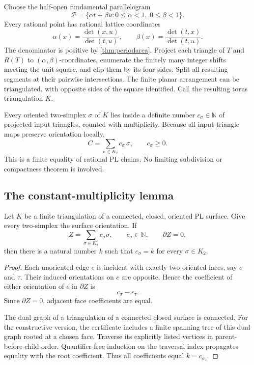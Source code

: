 Choose the half-open fundamental parallelogram
\[
 \mathcal P=\{\alpha t+\beta u:0\leq\alpha<1,\;0\leq\beta<1\}.
\]
Every rational point has rational lattice coordinates
\begin{equation}
 \alpha(x)=\frac{\det(x,u)}{\det(t,u)},
 \qquad
 \beta(x)=\frac{\det(t,x)}{\det(t,u)}.
 \label{eq:latticecoords}
\end{equation}
The denominator is positive by \cref{thm:periodarea}.  Project each triangle of \(T\) and \(R(T)\) to \((\alpha,\beta)\)-coordinates, enumerate the finitely many integer shifts meeting the unit square, and clip them by its four sides.  Split all resulting segments at their pairwise intersections.  The finite planar arrangement can be triangulated, with opposite sides of the square identified.  Call the resulting torus triangulation \(K\).

Every oriented two-simplex \(\sigma\) of \(K\) lies inside a definite number \(c_\sigma\in\mathbb N\) of projected input triangles, counted with multiplicity.  Because all input triangle maps preserve orientation locally,
\begin{equation}
 C=\sum_{\sigma\in K_2} c_\sigma\,\sigma,
 \qquad c_\sigma\geq 0.
 \label{eq:facecoeff}
\end{equation}
This is a finite equality of rational PL chains.  No limiting subdivision or compactness theorem is involved.

\subsection{The constant-multiplicity lemma}

\begin{lemma}
\label{lem:constantmultiplicity}
Let \(K\) be a finite triangulation of a connected, closed, oriented PL surface.  Give every two-simplex the surface orientation.  If
\[
 Z=\sum_{\sigma\in K_2} c_\sigma\sigma,
 \qquad c_\sigma\in\mathbb N,
 \qquad \partial Z=0,
\]
then there is a natural number \(k\) such that \(c_\sigma=k\) for every \(\sigma\in K_2\).
\end{lemma}
\begin{proof}
Each unoriented edge \(e\) is incident with exactly two oriented faces, say \(\sigma\) and \(\tau\).  Their induced orientations on \(e\) are opposite.  Hence the coefficient of either orientation of \(e\) in \(\partial Z\) is
\[
 c_\sigma-c_\tau.
\]
Since \(\partial Z=0\), adjacent face coefficients are equal.

The dual graph of a triangulation of a connected closed surface is connected.  For the constructive version, the certificate includes a finite spanning tree of this dual graph rooted at a chosen face.  Traverse its explicitly listed vertices in parent-before-child order.  Quantifier-free induction on the traversal index propagates equality with the root coefficient.  Thus all coefficients equal \(k=c_{\sigma_0}\).
\end{proof}


